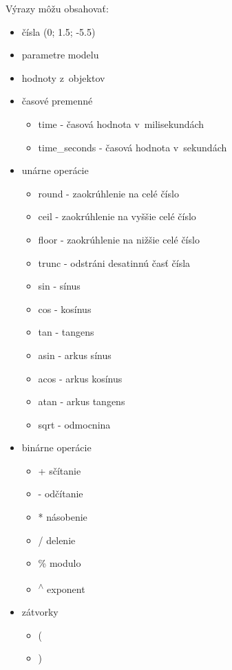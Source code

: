 Výrazy môžu obsahovať: 
\begin{itemize}
    \item  čísla (0; 1.5; -5.5)
    \item  parametre modelu
    \item  hodnoty z~objektov 
    \item  časové premenné
        \begin{itemize}
            \item  time - časová hodnota v~milisekundách
            \item  time\_seconds - časová hodnota v~sekundách
         \end{itemize}
    \item  unárne operácie
        \begin{itemize}
            \item  round - zaokrúhlenie na celé číslo
            \item  ceil - zaokrúhlenie na vyššie celé číslo
            \item  floor  - zaokrúhlenie na nižšie celé číslo
            \item  trunc  - odstráni desatinnú časť čísla
            \item  sin - sínus
            \item  cos - kosínus
            \item  tan - tangens
            \item  asin - arkus sínus 
            \item  acos - arkus kosínus
            \item  atan - arkus tangens
            \item  sqrt - odmocnina
         \end{itemize}
    \item  binárne operácie
        \begin{itemize}
            \item + sčítanie
            \item - odčítanie
            \item * násobenie
            \item / delenie
            \item \% modulo
            \item \textsuperscript{$\wedge$} exponent
         \end{itemize}
    \item  zátvorky
        \begin{itemize}
            \item  (
            \item  )
         \end{itemize}
 \end{itemize}
 
